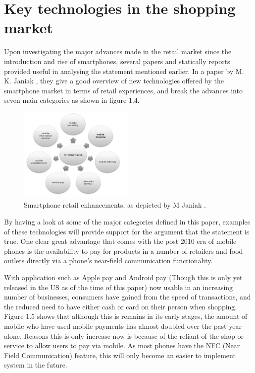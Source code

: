 \section{Key technologies in the shopping market} 

Upon investigating the major advances made in the retail market since the introduction and rise of smartphones, several papers and statically reports provided useful in analysing the statement mentioned earlier. In a paper by M. K. Janiak \cite{overview}, they give a good overview of new technologies offered by the smartphone market in terms of retail experiences, and break the advances into seven main categories as shown in figure 1.4. \par
 \begin{figure}[H]
  \caption{Smartphone retail enhancements, as depicted by M Janiak \cite{overview}.}
  \centering
  \label{fig:retail}
    \includegraphics[width=0.5\textwidth]{retail}
\end{figure}
By having a look at some of the major categories defined in this paper, examples of these technologies will provide support for the argument that the statement is true. One clear great advantage that comes with the post 2010 era of mobile phones is the availability to pay for products in a number of retailers and food outlets directly via a phone's near-field communication functionality. \par

With application such as Apple pay and Android pay (Though this is only yet released in the US as of the time of this paper) now usable in an increasing number of businesses, consumers have gained from the speed of transactions, and the reduced need to have either cash or card on their person when shopping. Figure 1.5 shows that although this is remains in its early stages, the amount of mobile who have used mobile payments has almost doubled over the past year alone. Reasons this is only increase now is because of the reliant of the shop or service to allow users to pay via mobile. As most phones have the NFC (Near Field Communication) feature, this will only become an easier to implement system in the future.

